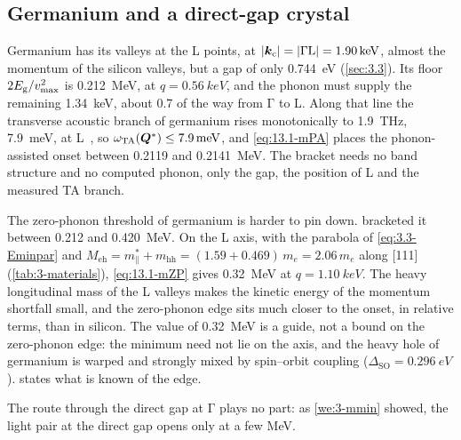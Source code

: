 \subsection{Germanium and a direct-gap crystal}

Germanium has its valleys at the L points, at $|\bm{k}_{\mathrm{c}}| = |\mathrm{\Gamma}\mathrm{L}| = \SI{1.90}{keV}$, almost the momentum of the silicon valleys, but a gap of only \SI{0.744}{eV} (\cref{sec:3.3}). Its floor $2E_{\mathrm{g}}/v_{\mathrm{max}}^2$ is \SI{0.212}{MeV}, at $q = \SI{0.56}{keV}$, and the phonon must supply the remaining \SI{1.34}{keV}, about 0.7 of the way from $\mathrm{\Gamma}$ to L. Along that line the transverse acoustic branch of germanium rises monotonically to \SI{1.9}{THz}, \SI{7.9}{meV}, at L~\cites{nilsson1971phonon}[Table~IV]{haxhijaj2026lattice}, so $\omega_{\mathrm{TA}}(\bm{Q}^*) \le \SI{7.9}{meV}$, and \cref{eq:13.1-mPA} places the phonon-assisted onset between 0.2119 and \SI{0.2141}{MeV}. The bracket needs no band structure and no computed phonon, only the gap, the position of L and the measured TA branch.

The zero-phonon threshold of germanium is harder to pin down.  bracketed it between 0.212 and \SI{0.420}{MeV}. On the L axis, with the parabola of \cref{eq:3.3-Eminpar} and $M_{\mathrm{eh}} = m^*_\parallel + m_{\mathrm{hh}} = (1.59 + 0.469)\,m_e = 2.06\,m_e$ along [111] (\cref{tab:3-materials}), \cref{eq:13.1-mZP} gives \SI{0.32}{MeV} at $q = \SI{1.10}{keV}$. The heavy longitudinal mass of the L valleys makes the kinetic energy of the momentum shortfall small, and the zero-phonon edge sits much closer to the onset, in relative terms, than in silicon. The value of \SI{0.32}{MeV} is a guide, not a bound on the zero-phonon edge: the minimum need not lie on the axis, and the heavy hole of germanium is warped and strongly mixed by spin--orbit coupling ($\Delta_{\mathrm{SO}} = \SI{0.296}{eV}$).  states what is known of the edge.

The route through the direct gap at $\mathrm{\Gamma}$ plays no part: as \cref{we:3-mmin} showed, the light pair at the direct gap opens only at a few MeV.

